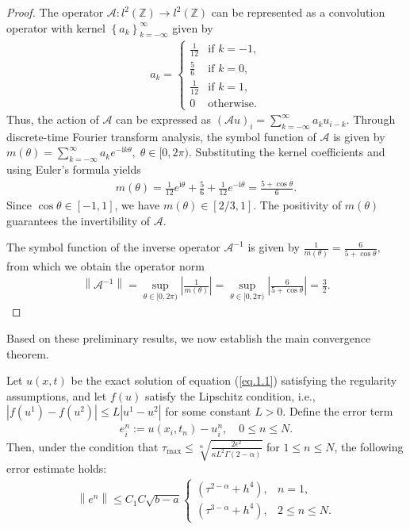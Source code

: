 \documentclass{siamart171218}
\theoremstyle{remark}
\theoremstyle{example}
\numberwithin{equation}{section}
\begin{document}
\begin{proof}
The operator $\mathcal{A}: l^2(\mathbb{Z}) \to l^2(\mathbb{Z})$ can be represented as a convolution operator with kernel $\left\{a_k\right\}_{k=-\infty}^{\infty}$ given by
\begin{align*}
a_k =
\begin{cases}
\frac{1}{12} & \text{if } k = -1, \\
\frac{5}{6} & \text{if } k = 0, \\
\frac{1}{12} & \text{if } k = 1, \\
0 & \text{otherwise}.
\end{cases}
\end{align*}
Thus, the action of $\mathcal{A}$ can be expressed
as $\left(\mathcal{A}u\right)_i =
\sum_{k=-\infty}^{\infty} a_k u_{i-k}$.
Through discrete-time Fourier transform analysis,
the symbol function of $\mathcal{A}$ is given by
$
m(\theta) = \sum\limits_{k=-\infty}^{\infty}a_k e^{-\mathrm{i}
 k \theta}, \;\theta \in [0, 2\pi).
$
Substituting the kernel coefficients and using Euler's formula yields
\begin{align*}
m(\theta) = \frac{1}{12} e^{\mathrm{i}\theta} + \frac{5}{6}
+ \frac{1}{12} e^{-\mathrm{i}\theta} = \frac{5 + \cos \theta}{6}.
\end{align*}
Since $\cos \theta \in [-1,1]$, we have $m(\theta) \in [{2}/{3},1]$. The positivity of $m(\theta)$ guarantees the invertibility of $\mathcal{A}$.

The symbol function of the inverse operator $\mathcal{A}^{-1}$ is given by
$
\frac{1}{m(\theta)} = \frac{6}{5 + \cos \theta},
$
from which we obtain the operator norm
\begin{align*}
\left\|\mathcal{A}^{-1}\right\| = \sup_{\theta \in [0, 2\pi)} \left|\frac{1}{m(\theta)}\right| = \sup_{\theta \in [0, 2\pi)}
\left|\frac{6}{5 + \cos \theta}\right| = \frac{3}{2}.
\end{align*}
\end{proof}

Based on these preliminary results, we now
establish the main convergence theorem.

\begin{theorem}\label{Th.4.8}
Let $u(x,t)$ be the exact solution of equation
(\ref{eq.1.1}) satisfying the regularity assumptions,
and let $f(u)$ satisfy the Lipschitz condition,
i.e.,
$\left|f(u^1) - f(u^2)\right| \leq L|u^1 - u^2|
$
for some constant $L>0$. Define the error term
\begin{align*}
e_{i}^n := u(x_i,t_n) - u_{i}^n, \quad 0 \leq n \leq N.
\end{align*}
Then, under the condition that $\tau_{\max} \leq \sqrt[\alpha]{\frac{2\epsilon^2}{\kappa L^2 \Gamma(2-\alpha)}}$ for $1 \leq n \leq N$, the following error estimate holds:
\begin{align*}
\left\| e^n\right\| \leq C_1 C\sqrt{b-a}
\begin{cases}
\left(\tau^{2-\alpha}+h^4\right), & n =1, \\
\left(\tau^{3-\alpha}+h^4\right), & 2\leq n \leq N.
\end{cases}
\end{align*}
\end{theorem}
\end{document}
